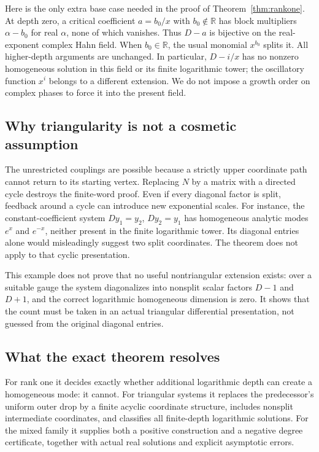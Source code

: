 \documentclass[11pt,a4paper]{article}
\numberwithin{equation}{section}
\theoremstyle{definition}
\theoremstyle{remark}\newtheorem{remark}[theorem]{Remark}
\newcommand{\R}{\mathbb R}\newcommand{\C}{\mathbb C}
\begin{document}
Here is the only extra base case needed in the proof of Theorem~\ref{thm:rankone}. At depth zero, a critical coefficient $a=b_0/x$ with $b_0\notin\R$ has block multipliers $\alpha-b_0$ for real $\alpha$, none of which vanishes. Thus $D-a$ is bijective on the real-exponent complex Hahn field. When $b_0\in\R$, the usual monomial $x^{b_0}$ splits it. All higher-depth arguments are unchanged. In particular, $D-i/x$ has no nonzero homogeneous solution in this field or its finite logarithmic tower; the oscillatory function $x^i$ belongs to a different extension. We do not impose a growth order on complex phases to force it into the present field.

\subsection{Why triangularity is not a cosmetic assumption}
The unrestricted couplings are possible because a strictly upper coordinate path cannot return to its starting vertex. Replacing $N$ by a matrix with a directed cycle destroys the finite-word proof. Even if every diagonal factor is split, feedback around a cycle can introduce new exponential scales. For instance, the constant-coefficient system $Dy_1=y_2$, $Dy_2=y_1$ has homogeneous analytic modes $e^x$ and $e^{-x}$, neither present in the finite logarithmic tower. Its diagonal entries alone would misleadingly suggest two split coordinates. The theorem does not apply to that cyclic presentation.

This example does not prove that no useful nontriangular extension exists: over a suitable gauge the system diagonalizes into nonsplit scalar factors $D-1$ and $D+1$, and the correct logarithmic homogeneous dimension is zero. It shows that the count must be taken in an actual triangular differential presentation, not guessed from the original diagonal entries.

\subsection{What the exact theorem resolves}
For rank one it decides exactly whether additional logarithmic depth can create a homogeneous mode: it cannot. For triangular systems it replaces the predecessor's uniform outer drop by a finite acyclic coordinate structure, includes nonsplit intermediate coordinates, and classifies all finite-depth logarithmic solutions. For the mixed family it supplies both a positive construction and a negative degree certificate, together with actual real solutions and explicit asymptotic errors.
\end{document}
